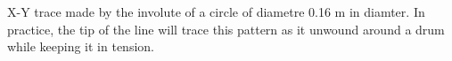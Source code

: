 \label{fig:spiral} X-Y trace made by the involute of a circle of diametre 0.16 m in diamter. In practice, the tip of the line will trace this pattern as it unwound around a drum while keeping it in tension.